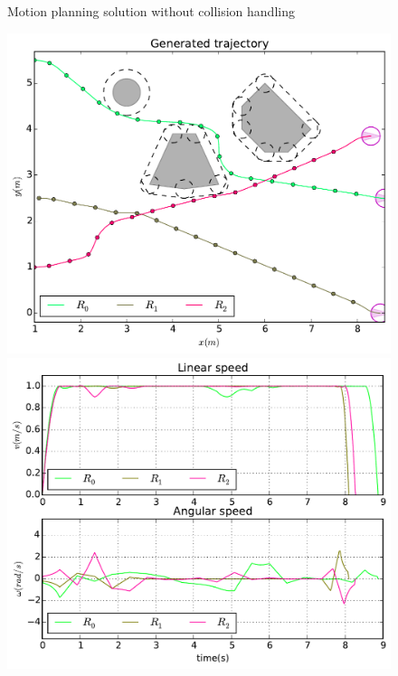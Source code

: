 \documentclass[eprint]{actapoly}
\begin{document}
\begin{figure}[!h]
  \caption{Motion planning solution without collision handling\label{fig:collision}}
\label{fig:res}
\end{figure}

\begin{figure}\centering
  \includegraphics[width=\linewidth]{./images/no_collision/multirobot-path2.pdf} 
  \\[1mm]
  \includegraphics[width=\linewidth]{./images/no_collision/multirobot-vw.pdf} %

\end{figure}
\end{document}
